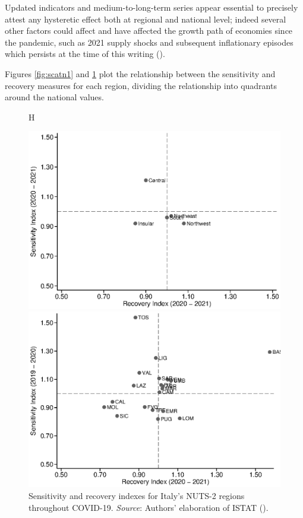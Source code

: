 \documentclass[12pt]{article}
\begin{document}
Updated indicators and medium-to-long-term series appear essential to precisely attest any hysteretic effect both at regional and national level; indeed several other factors could affect and have affected the growth path of economies since the pandemic, such as 2021 supply shocks and subsequent inflationary episodes which persists at the time of this writing (\cite{ubide2022inflation}).

Figures \ref{fig:scatn1} and \ref{fig:scatn2} plot the relationship between the sensitivity and recovery measures for each region, dividing the relationship into quadrants around the national values.

\begin{figure}{H}
    \centering
    \begin{minipage}[t]{.45\textwidth}
    \centering
    \includegraphics[width=\textwidth]{scatb.eps}
    \caption{Sensitivity and recovery indexes for Italy's NUTS-1 regions throughout COVID-19. \textit{Source}: Author's elaboration of ISTAT (\citeyear{istat}).}
    \label{fig:scatn1}
    \end{minipage}\hfill
    \begin{minipage}[t]{.45\textwidth}
    \centering
    \includegraphics[width=\textwidth]{scatn2.eps}
    \caption{Sensitivity and recovery indexes for Italy's NUTS-2 regions throughout COVID-19. \textit{Source}: Authors’ elaboration of ISTAT (\citeyear{istat}).}
    \label{fig:scatn2}
    \end{minipage}
\end{figure}
\end{document}

